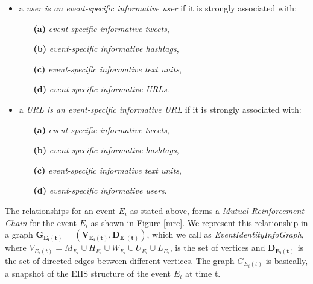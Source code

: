 \begin{itemize} 
\item a \textit{user is an event-specific informative user} if it is strongly associated with:
\begin{itemize}
\item[\textbf{(a)}] \textit{event-specific informative tweets}, 
\item[\textbf{(b)}] \textit{event-specific informative hashtags}, 
\item[\textbf{(c)}] \textit{event-specific informative text units},
\item[\textbf{(d)}] \textit{event-specific informative URLs}. 
\end{itemize}
\end{itemize}

\begin{itemize} \item a \textit{URL is an event-specific informative URL} if it is strongly associated with:
\begin{itemize}
\item[\textbf{(a)}] \textit{event-specific informative tweets}, 
\item[\textbf{(b)}] \textit{event-specific informative hashtags}, 
\item[\textbf{(c)}] \textit{event-specific informative text units},
\item[\textbf{(d)}] \textit{event-specific informative users}. 
\end{itemize}
\end{itemize}


The relationships for an event $E_{i}$ as stated above, forms a \textit{Mutual Reinforcement Chain} \cite{wei2008query} for the event $E_{i}$ as shown in Figure \ref{mrc}. We represent this relationship in a graph $\mathbf{G_{E_{i}(t)} = (V_{E_{i}(t)},D_{E_{i}(t)})}$, which we call as \textit{EventIdentityInfoGraph}, where $V_{E_{i}(t)} = M_{E_{i}} \cup H_{E_{i}} \cup W_{E_{i}} \cup U_{E_{i}} \cup L_{E_{i}}$, is the set of vertices and $\mathbf{D_{E_{i}(t)}}$ is the set of directed edges between different vertices. The graph $G_{E_{i}(t)}$ is basically, a snapshot of the EIIS structure of the event $E_{i}$ at time t. 

